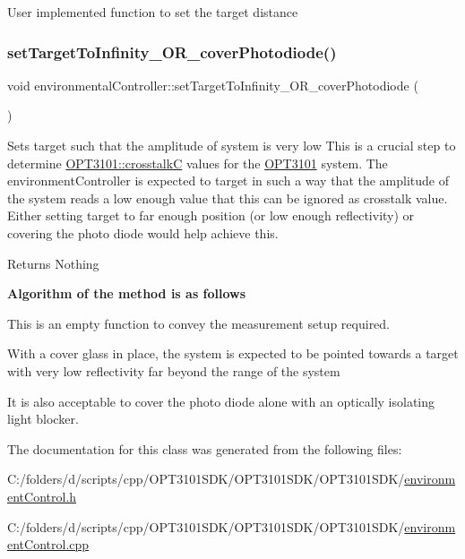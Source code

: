 \begin{DoxyItemize}
\item User implemented function to set the target distance 
\end{DoxyItemize}\mbox{\label{classenvironmental_controller_a8a1fb44efff232844f00de18e174d4ce}} 
\subsubsection{\texorpdfstring{set\+Target\+To\+Infinity\+\_\+\+O\+R\+\_\+cover\+Photodiode()}{setTargetToInfinity\_OR\_coverPhotodiode()}}
{\footnotesize\ttfamily void environmental\+Controller\+::set\+Target\+To\+Infinity\+\_\+\+O\+R\+\_\+cover\+Photodiode (\begin{DoxyParamCaption}{ }\end{DoxyParamCaption})}



Sets target such that the amplitude of system is very low This is a crucial step to determine \mbox{\hyperlink{class_o_p_t3101_1_1crosstalk_c}{O\+P\+T3101\+::crosstalkC}} values for the \mbox{\hyperlink{namespace_o_p_t3101}{O\+P\+T3101}} system. The environment\+Controller is expected to target in such a way that the amplitude of the system reads a low enough value that this can be ignored as crosstalk value. Either setting target to far enough position (or low enough reflectivity) or covering the photo diode would help achieve this. 

\begin{DoxyReturn}{Returns}
Nothing 
\end{DoxyReturn}
{\bfseries Algorithm of the method is as follows}
\begin{DoxyItemize}
\item This is an empty function to convey the measurement setup required.
\item With a cover glass in place, the system is expected to be pointed towards a target with very low reflectivity far beyond the range of the system
\item It is also acceptable to cover the photo diode alone with an optically isolating light blocker. 
\end{DoxyItemize}

The documentation for this class was generated from the following files\+:\begin{DoxyCompactItemize}
\item 
C\+:/folders/d/scripts/cpp/\+O\+P\+T3101\+S\+D\+K/\+O\+P\+T3101\+S\+D\+K/\+O\+P\+T3101\+S\+D\+K/\mbox{\hyperlink{environment_control_8h}{environment\+Control.\+h}}\item 
C\+:/folders/d/scripts/cpp/\+O\+P\+T3101\+S\+D\+K/\+O\+P\+T3101\+S\+D\+K/\+O\+P\+T3101\+S\+D\+K/\mbox{\hyperlink{environment_control_8cpp}{environment\+Control.\+cpp}}\end{DoxyCompactItemize}
